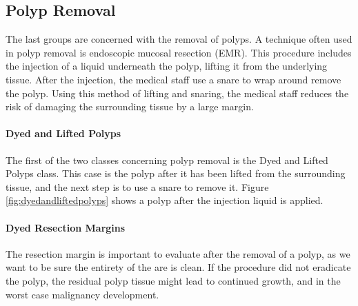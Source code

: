 \subsection{Polyp Removal}
The last groups are concerned with the removal of polyps. A technique often used in polyp removal is endoscopic mucosal resection (EMR). 
This procedure includes the injection of a liquid underneath the polyp, lifting it from the underlying tissue. After the injection, the medical staff use a snare to wrap around remove the polyp. Using this method of lifting and snaring, the medical staff reduces the risk of damaging the surrounding tissue by a large margin.

\paragraph{Dyed and Lifted Polyps}
The first of the two classes concerning polyp removal is the Dyed and Lifted Polyps class. This case is the polyp after it has been lifted from the surrounding tissue, and the next step is to use a snare to remove it.
Figure \ref{fig:dyedandliftedpolyps} shows a polyp after the injection liquid is applied. 


\paragraph{Dyed Resection Margins}
The resection margin is important to evaluate after the removal of a polyp, as we want to be sure the entirety of the are is clean. 
If the procedure did not eradicate the polyp, the residual polyp tissue might lead to continued growth, and in the worst case malignancy development. 

    
\fi


